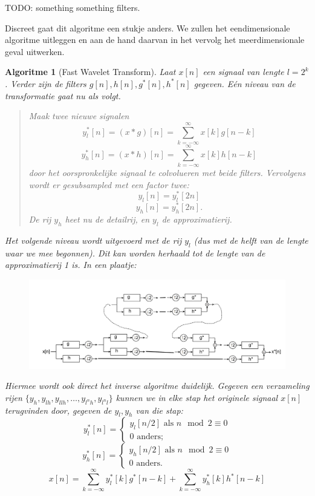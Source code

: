 \documentclass[11pt]{amsart}
\newtheorem*{algoritme}{Algoritme}
\begin{document}
TODO: something something filters.

Discreet gaat dit algoritme een stukje anders. We zullen het eendimensionale algoritme uitleggen en aan de hand daarvan in het vervolg het meerdimensionale geval uitwerken.

\begin{algoritme}[Fast Wavelet Transform]
Laat $x[n]$ een signaal van lengte $l = 2^k$. Verder zijn de filters $g[n], h[n],g^*[n], h^*[n]$ gegeven. E\'en niveau van de transformatie gaat nu als volgt.

\begin{quote}
Maak twee nieuwe signalen 
\[
y_l^*[n] = (x * g)[n] = \sum_{k=-\infty}^\infty x[k]g[n-k]
\]
\[
y_h^*[n] = (x * h)[n] = \sum_{k=-\infty}^\infty x[k]h[n-k]
\]
door het oorspronkelijke signaal te colvolueren met beide filters. Vervolgens wordt er ge\emph{subsampled} met een factor twee:
\[
y_l[n] = y_l^*[2n]
\]
\[
y_h[n] = y_h^*[2n].
\]
De rij $y_h$ heet nu de \emph{detail}rij, en $y_l$ de \emph{approximatie}rij.
\end{quote}
Het volgende niveau wordt uitgevoerd met de rij $y_l$ (dus met de helft van de lengte waar we mee begonnen). Dit kan worden herhaald tot de lengte van de approximatierij 1 is. In een plaatje:
\begin{figure}[h]
\includegraphics{filter_bank_kankerzuur.jpg}
\end{figure}

Hiermee wordt ook direct het inverse algoritme duidelijk. Gegeven een verzameling rijen $\{y_h, y_{lh}, y_{llh}, \ldots, y_{l^nh}, y_{l^nl}\}$ kunnen we in elke stap het originele signaal $x[n]$ terugvinden door, gegeven de $y_l, y_h$ van die stap:
\[
	y^*_{l}[n] = \begin{cases} y_{l}[n/2] \text{ als } n \mod{2} \equiv 0 \\ 0 \text{ anders}; \end{cases}
\]
\[
	y^*_{h}[n] = \begin{cases} y_{h}[n/2] \text{ als } n \mod{2} \equiv 0 \\ 0 \text{ anders}. \end{cases}
\]
\[
	x[n] = \sum_{k=-\infty}^\infty y^*_{l}[k]g^*[n-k] + \sum_{k=-\infty}^\infty y^*_{h}[k]h^*[n-k]
\]

\end{algoritme}
\end{document}
